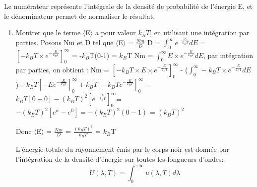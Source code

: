 \documentclass{article}
\begin{document}
\noindent
Le numérateur représente l'intégrale de la densité de probabilité de l'énergie E, et le dénominateur permet de normaliser le résultat.\newpage
\begin{enumerate}
    \item Montrer que le terme $\langle$E$\rangle$ a pour valeur $k_{B}T$, en utilisant une intégration par parties. \newline \newline\newline
    Posons Nm et D tel que $\langle$E$\rangle$ = $\frac{Nm}{D}$\newline\newline
    D = $\int_{0}^{\infty} e^{-\frac{E}{k_{B}T}} dE$ = $[-k_{B}T\times e^{-\frac{E}{k_{B}T}}]_{0}^{\infty}$ = -$k_{B}$T(0-1) = $k_{B}$T \newline \newline
    Nm = $\int_{0}^{\infty} E\times e^{-\frac{E}{k_{B}T}}dE$, par intégration par parties, on obtient :\newline\newline
    Nm = $[-k_{B}T\times E\times e^{-\frac{E}{k_{B}T}}]_{0}^{\infty}$ - ($\int_{0}^{\infty} -k_{B}T\times e^{-\frac{E}{k_{B}T}}dE$)\newline\newline = $k_{B}T [-Ee^{-\frac{E}{k_{B}T}}]_{0}^{\infty} + k_{B}T[-k_{B}Te^{-\frac{E}{k_{B}T}}]_{0}^{\infty}$ \newline\newline= $k_{B}T[0-0] - (k_{B}T)^{2} [e^{-\frac{E}{k_{B}T}}]_{0}^{\infty}$\newline\newline = $-(k_{B}T)^{2} [e^{\alpha} - e^{0}] = -(k_{B}T)^{2} (0-1)$ = $(k_{B}T)^{2}$ \newline\newline

    Donc $\langle$E$\rangle$ = $\frac{Nm}{D}$ = $\frac{(k_{B}T)^{2}}{k_{B}T}$ = $k_{B}$T\newline\newline

    L'énergie totale du rayonnement émis par le corps noir est donnée par l'intégration de la densité d'énergie sur toutes les longueurs d'ondes:
    \[ U(\lambda,T) = \int_{0}^{+\infty} u(\lambda,T)d\lambda\]


\end{enumerate}
\end{document}
